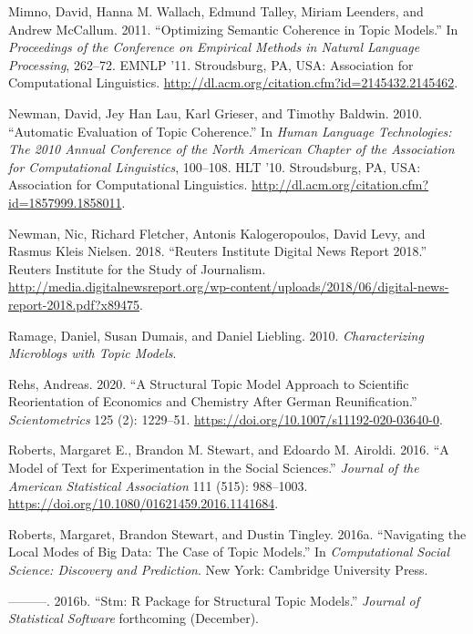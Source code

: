 \documentclass[
]{article}
\begin{document}
\leavevmode\hypertarget{ref-mimno_optimizing_2011}{}%
Mimno, David, Hanna M. Wallach, Edmund Talley, Miriam Leenders, and
Andrew McCallum. 2011. ``Optimizing Semantic Coherence in Topic
Models.'' In \emph{Proceedings of the Conference on Empirical Methods in
Natural Language Processing}, 262--72. EMNLP '11. Stroudsburg, PA, USA:
Association for Computational Linguistics.
\url{http://dl.acm.org/citation.cfm?id=2145432.2145462}.

\leavevmode\hypertarget{ref-newman_automatic_2010}{}%
Newman, David, Jey Han Lau, Karl Grieser, and Timothy Baldwin. 2010.
``Automatic Evaluation of Topic Coherence.'' In \emph{Human Language
Technologies: The 2010 Annual Conference of the North American Chapter
of the Association for Computational Linguistics}, 100--108. HLT '10.
Stroudsburg, PA, USA: Association for Computational Linguistics.
\url{http://dl.acm.org/citation.cfm?id=1857999.1858011}.

\leavevmode\hypertarget{ref-newman_reuters_2018}{}%
Newman, Nic, Richard Fletcher, Antonis Kalogeropoulos, David Levy, and
Rasmus Kleis Nielsen. 2018. ``Reuters Institute Digital News Report
2018.'' Reuters Institute for the Study of Journalism.
\url{http://media.digitalnewsreport.org/wp-content/uploads/2018/06/digital-news-report-2018.pdf?x89475}.

\leavevmode\hypertarget{ref-ramage_characterizing_2010}{}%
Ramage, Daniel, Susan Dumais, and Daniel Liebling. 2010.
\emph{Characterizing Microblogs with Topic Models}.

\leavevmode\hypertarget{ref-rehs_structural_2020}{}%
Rehs, Andreas. 2020. ``A Structural Topic Model Approach to Scientific
Reorientation of Economics and Chemistry After German Reunification.''
\emph{Scientometrics} 125 (2): 1229--51.
\url{https://doi.org/10.1007/s11192-020-03640-0}.

\leavevmode\hypertarget{ref-roberts_model_2016}{}%
Roberts, Margaret E., Brandon M. Stewart, and Edoardo M. Airoldi. 2016.
``A Model of Text for Experimentation in the Social Sciences.''
\emph{Journal of the American Statistical Association} 111 (515):
988--1003. \url{https://doi.org/10.1080/01621459.2016.1141684}.

\leavevmode\hypertarget{ref-roberts_navigating_2016}{}%
Roberts, Margaret, Brandon Stewart, and Dustin Tingley. 2016a.
``Navigating the Local Modes of Big Data: The Case of Topic Models.'' In
\emph{Computational Social Science: Discovery and Prediction}. New York:
Cambridge University Press.

\leavevmode\hypertarget{ref-roberts_stm:_2016}{}%
---------. 2016b. ``Stm: R Package for Structural Topic Models.''
\emph{Journal of Statistical Software} forthcoming (December).
\end{document}
